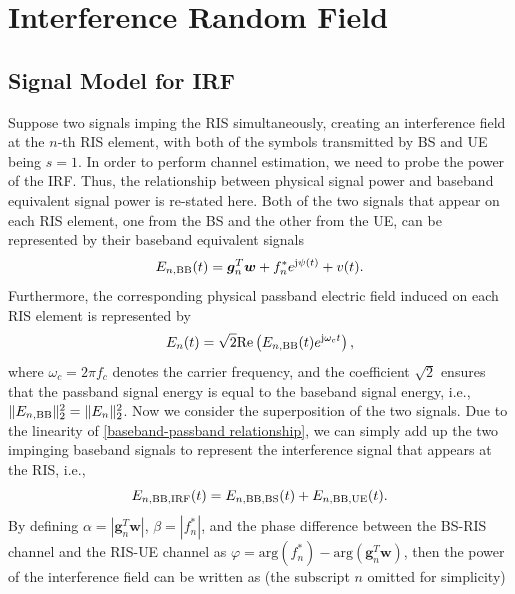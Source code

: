 \documentclass[12pt,draftclsnofoot,journal,onecolumn]{IEEEtran}
\theoremstyle{nonumberplain}
\def \arg {\text{arg}}
\begin{document}
\section{Interference Random Field}
\label{Interference Random Field}

\subsection{Signal Model for IRF}
\label{Models for IRFs}
    Suppose two signals imping the RIS simultaneously, creating an interference field \cite{louradour1993interference} at the $n$-th RIS element, with both of the symbols transmitted by \ac{BS} and \ac{UE} being $s=1$. In order to perform channel estimation, we need to probe the power of the \ac{IRF}. Thus, the relationship between physical signal power and baseband equivalent signal power is re-stated here. Both of the two signals that appear on each RIS element, one from the \ac{BS} and the other from the \ac{UE}, can be represented by their baseband equivalent signals
    \begin{equation}
    \label{interference}
    E_{n,{\rm BB}}(t)=\bm g_{n}^{T}\bm w+f_{n}^{*}e^{{\rm j}\psi (t)}+v(t).
    \end{equation}
    Furthermore, the corresponding physical passband electric field induced on each RIS element is represented by 
    \begin{equation}
        E_{n}(t) = \sqrt{2} {\rm Re}\left( E_{n,{\rm BB}}(t)e^{{\rm j}\omega_c t} \right),
        \label{baseband-passband relationship}
    \end{equation}
    where $\omega_c = 2\pi f_c$ denotes the carrier frequency, and the coefficient $\sqrt{2}$ ensures that the passband signal energy is equal to the baseband signal energy, i.e., 
    $\lVert E_{n, {\rm BB}}\rVert_2^2 = \lVert E_{n}\rVert_2^2$. 
    Now we consider the superposition of the two signals. Due to the linearity of \eqref{baseband-passband relationship}, we can simply add up the two impinging baseband signals to represent the interference signal that appears at the RIS, i.e., 
    \begin{equation}
        E_{n,{\rm BB, IRF}}(t) = E_{n, {\rm BB, BS}}(t)+E_{n,{\rm BB, UE}}(t).
    \end{equation}
    By defining $\alpha = \left\vert\bm g_{n}^{T}\bm w\right\vert$, $\beta = \left\vert f_{n}^{*}\right \vert$, and the phase difference between the \ac{BS}-\ac{RIS} channel and the \ac{RIS}-\ac{UE} channel as $\varphi = \arg\left(f_{n}^{*}\right)-\arg\left(\bm g_{n}^{T}\bm w\right)$, then the power of the interference field can be written as (the subscript $n$ omitted for simplicity)
\end{document}
